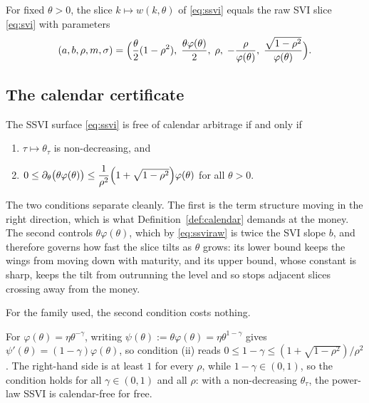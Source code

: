 \begin{lemma}\label{lem:ssvi2svi}
For fixed $\theta>0$, the slice $k\mapsto w(k,\theta)$ of \eqref{eq:ssvi} equals the raw SVI
slice \eqref{eq:svi} with parameters
\begin{equation}\label{eq:ssviraw}
(a,b,\rho,m,\sigma)
=\Bigl(\frac{\theta}{2}(1-\rho^2),\;\frac{\theta\varphi(\theta)}{2},\;\rho,\;
-\frac{\rho}{\varphi(\theta)},\;\frac{\sqrt{1-\rho^2}}{\varphi(\theta)}\Bigr).
\end{equation}
\end{lemma}


\subsection{The calendar certificate}

\begin{proposition}\label{thm:gjcal}
The SSVI surface \eqref{eq:ssvi} is free of calendar arbitrage if and only if
\begin{enumerate}[label=(\roman*)]
\item $\tau\mapsto\theta_\tau$ is non-decreasing, and
\item $0\le\partial_\theta\bigl(\theta\varphi(\theta)\bigr)\le
\dfrac{1}{\rho^{2}}\Bigl(1+\sqrt{1-\rho^{2}}\Bigr)\varphi(\theta)$ for all $\theta>0$.
\end{enumerate}
\end{proposition}


The two conditions separate cleanly. The first is the term structure moving in the right
direction, which is what Definition~\ref{def:calendar} demands at the money. The second controls
$\theta\varphi(\theta)$, which by \eqref{eq:ssviraw} is twice the SVI slope $b$, and therefore
governs how fast the slice tilts as $\theta$ grows: its lower bound keeps the wings from moving
down with maturity, and its upper bound, whose constant is sharp, keeps the tilt from outrunning
the level and so stops adjacent slices crossing away from the money.

For the family used, the second condition costs nothing.

\begin{example}\label{ex:powerlawcal}
For $\varphi(\theta)=\eta\theta^{-\gamma}$, writing
$\psi(\theta):=\theta\varphi(\theta)=\eta\theta^{1-\gamma}$ gives
$\psi'(\theta)=(1-\gamma)\varphi(\theta)$, so condition (ii) reads
$0\le1-\gamma\le(1+\sqrt{1-\rho^2})/\rho^2$. The right-hand side is at least $1$ for every
$\rho$, while $1-\gamma\in(0,1)$, so the condition holds for all $\gamma\in(0,1)$ and all
$\rho$: with a non-decreasing $\theta_\tau$, the power-law SSVI is calendar-free for free.
\end{example}

